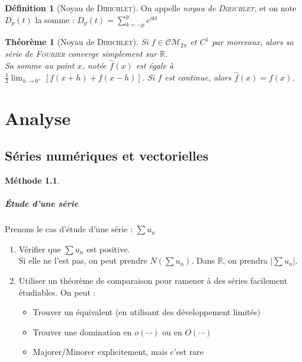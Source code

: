 \documentclass[11pt,a4paper]{report}
\newtheorem{itheorem}[theorem]{Théorème}
\theoremstyle{definition}
\newtheorem{dfn}[theorem]{Définition}
\newtheorem{methode}[theorem]{Méthode}
\begin{document}
\begin{dfn}[Noyau de \textsc{Dirichlet}]
On appelle \emph{noyau de \textsc{Dirichlet}}, et on note $D_p(t)$ la somme : $D_p(t)=\sum_{k=-p}^p e^{ikt}$
\end{dfn}
\begin{itheorem}[Noyau de \textsc{Dirichlet}]
Si $f \in \mathcal{CM}_{2\pi}$ et $C^1$ par morceaux, alors sa série de \textsc{Fourier} \emph{converge simplement} sur \ensuremath{\mathbb{R}}. \\
\emph{Sa somme} au point $x$, notée $\overset{\sim}{f}(x)$ est égale à $\frac{1}{2}\lim_{h\to 0^+}[f(x+h) + f(x-h)]$. Si $f$ est \emph{continue}, alors $\overset{\sim}{f}(x) = f(x)$.
\end{itheorem}

\part{Analyse}
\chapter{Séries numériques et vectorielles} %
\label{cha:series}
\begin{methode}
     \subsubsection*{Étude d'une série}
Prenons le cas d'étude d'une série : $ \sum u_n$
\begin{enumerate}
    \item Vérifier que $\sum u_n$ est positive. \\ Si elle ne l'est pas, on peut prendre $N(\sum u_n)$. Dans \ensuremath{\mathbb{R}}, on prendra $\left| \sum u_n \right|$.
    \item Utiliser un théorème de comparaison pour ramener à des séries facilement étudiables. On peut : 
    \begin{itemize}
        \item Trouver un équivalent (en utilisant des développement limités)
        \item Trouver une domination en $o(\cdots)$ ou en $O(\cdots)$
        \item Majorer/Minorer explicitement, mais c'est rare
    \end{itemize}
\end{enumerate}
\end{methode}
\end{document}

